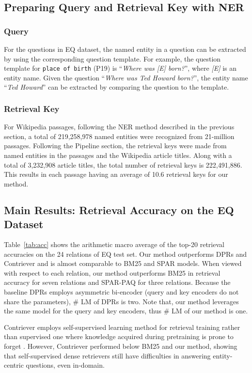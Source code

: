 \documentclass[letterpaper]{article} \usepackage{aaai23}  \usepackage{times}  \usepackage{helvet}  \usepackage{courier}  \usepackage[hyphens]{url}  \usepackage{graphicx} \urlstyle{rm} \def\UrlFont{\rm}  \usepackage{natbib}  \usepackage{caption} \frenchspacing  \setlength{\pdfpagewidth}{8.5in}  \setlength{\pdfpageheight}{11in}  \usepackage{algorithm}
\begin{document}
\subsection{Preparing Query and Retrieval Key with NER}\label{sec:q_k_gen}
\subsubsection{Query}
For the questions in EQ dataset, the named entity in a question can be extracted by using the corresponding question template.
For example, the question template for \texttt{\small place of birth} (P19) is ``\textit{Where was [E] born?}'', where \textit{[E]} is an entity name.
Given the question ``\textit{Where was Ted Howard born?}'', the entity name ``\textit{Ted Howard}'' can be extracted by comparing the question to the template.

\subsubsection{Retrieval Key}
For Wikipedia passages, following the NER method described in the previous section, a total of 219,258,978 named entities were recognized from 21-million passages.
Following the Pipeline section, the retrieval keys were made from named entities in the passages and the Wikipedia article titles.
Along with a total of 3,232,908 article titles, the total number of retrieval keys is 222,491,886.
This results in each passage having an average of 10.6 retrieval keys for our method.




\subsection{Main Results: Retrieval Accuracy on the EQ Dataset}\label{sec:results_eq}
Table~\ref{tab:acc} shows the arithmetic macro average of the top-20 retrieval accuracies on the 24 relations of EQ test set.
Our method outperforms DPRs and Contriever and is almost comparable to BM25 and SPAR models.
When viewed with respect to each relation, our method outperforms BM25 in retrieval accuracy for seven relations and SPAR-PAQ for three relations.
Because the baseline DPRs employs asymmetric bi-encoder (query and key encoders do not share the parameters), \# LM of DPRs is two.
Note that, our method leverages the same model for the query and key encoders, thus \# LM of our method is one.

Contriever employs self-supervised learning method for retrieval training rather than supervised one where knowledge acquired during pretraining is prone to forget \citep[e.g.,][]{zhou-srikumar-2022-closer}.
However, Contriever performed below BM25 and our method, showing that self-supervised dense retrievers still have difficulties in answering entity-centric questions, even in-domain.
\end{document}
